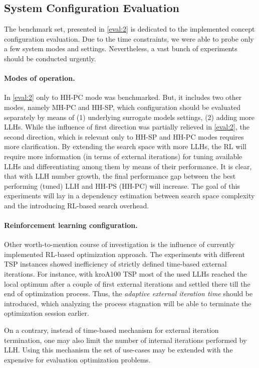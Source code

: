 \subsection{System Configuration Evaluation}
The benchmark set, presented in \cref{eval:2} is dedicated to the implemented concept configuration evaluation. Due to the time constraints, we were able to probe only a few system modes and settings. Nevertheless, a vast bunch of experiments should be conducted urgently.

\paragraph{Modes of operation.} In \cref{eval:2} only to HH-PC mode was benchmarked. But, it includes two other modes, namely MH-PC and HH-SP, which configuration should be evaluated separately by means of (1) underlying surrogate models settings, (2) adding more LLHs. While the influence of first direction was partially relieved in \cref{eval:2}, the second direction, which is relevant only to HH-SP and HH-PC modes requires more clarification. By extending the search space with more LLHs, the RL will require more information (in terms of external iterations) for tuning available LLHs and differentiating among them by means of their performance. It is clear, that with LLH number growth, the final performance gap between the best performing (tuned) LLH and HH-PS (HH-PC) will increase. The goal of this experiments will lay in a dependency estimation between search space complexity and the introducing RL-based search overhead.

\paragraph{Reinforcement learning configuration.} Other worth-to-mention course of investigation is the influence of currently implemented RL-based optimization approach. The experiments with different TSP instances showed inefficiency of strictly defined time-based external iterations. For instance, with kroA100 TSP most of the used LLHs reached the local optimum after a couple of first external iterations and settled there till the end of optimization process. Thus, the \emph{adaptive external iteration time} should be introduced, which analyzing the process stagnation will be able to terminate the optimization session earlier. 

On a contrary, instead of time-based mechanism for external iteration termination, one may also limit the number of internal iterations performed by LLH. Using this mechanism the set of use-cases may be extended with the expensive for evaluation optimization problems.